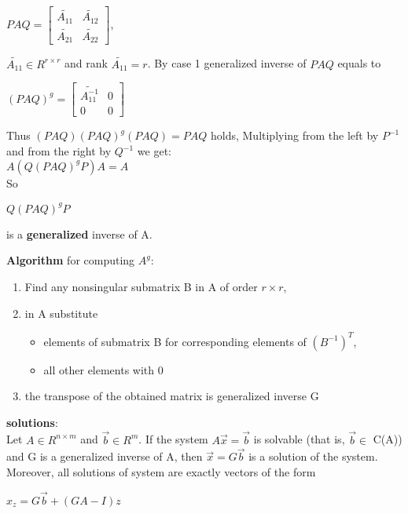 \documentclass{article}
\begin{document}
\begin{multicols}{2}
\begin{enumerate}
\begin{center}
\begin{math}
                PAQ =
                \begin{bmatrix}
                    \tilde{A_{11}} & \tilde{A_{12}} \\
                    \tilde{A_{21}} & \tilde{A_{22}}
                \end{bmatrix}
            \end{math},
        \end{center}
        $\tilde{A_{11}} \in R^{r \times r}$ and rank $\tilde{A_{11}} = r$. By case 1 
        generalized inverse of $PAQ$ equals to
        \begin{center}
            \begin{math}
                (PAQ)^g=
                \begin{bmatrix}
                    \tilde{A_{11}^{-1}} & 0 \\
                    0           & 0
                \end{bmatrix}
            \end{math}
        \end{center}
        Thus $(PAQ) (PAQ)^g (PAQ) = PAQ$ holds,
        Multiplying from the left by $P^{-1}$ and from the right
        by $Q^{-1}$ we get:\\ 
        $A(Q (PAQ)^g P)A = A$\\
        So \begin{center}
            \begin{math}
                Q (PAQ)^g P
            \end{math}
        \end{center}
        is a \textbf{generalized} inverse of A.
\end{enumerate}
\textbf{Algorithm} for computing \textbf{$A^g$}:
\begin{enumerate}
    \item Find any nonsingular submatrix B in A of order $r \times r$,
    \item in A substitute
        \begin{itemize}
            \item elements of submatrix B for corresponding elements of $(B^{-1})^T$,
            \item all other elements with 0
        \end{itemize}
    \item the transpose of the obtained matrix is generalized inverse G
\end{enumerate}
\textbf{solutions}:\\
Let $A \in R^{n \times m}$ and $\vec{b} \in R^m$. 
If the system $A\vec{x} = \vec{b}$ is
solvable (that is, $\vec{b} \in$ C(A)) and G is a 
generalized inverse of A, then $\vec{x}=G\vec{b}$ is
a solution of the system. Moreover, 
all solutions of system are exactly vectors of the form
\begin{center}
    \begin{math}
        x_z = G\vec{b} + (GA - I)z
    \end{math}
\end{center}


\end{multicols}
\end{document}
